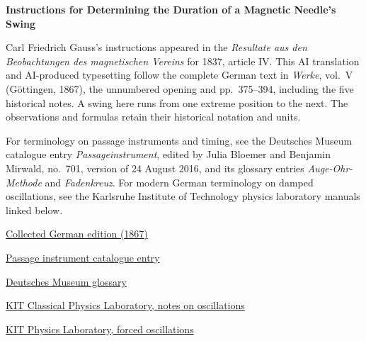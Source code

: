 \clearpage
\thispagestyle{empty}
\begin{center}\Large\textbf{Instructions for Determining the Duration of a Magnetic Needle’s Swing}\end{center}

Carl Friedrich Gauss’s instructions appeared in the \textit{Resultate aus den Beobachtungen des magnetischen Vereins} for 1837, article IV. This AI translation and AI-produced typesetting follow the complete German text in \textit{Werke}, vol.~V (Göttingen, 1867), the unnumbered opening and pp.~375--394, including the five historical notes. A swing here runs from one extreme position to the next. The observations and formulas retain their historical notation and units.

\smallskip\noindent
For terminology on passage instruments and timing, see the Deutsches Museum catalogue entry \textit{Passageinstrument}, edited by Julia Bloemer and Benjamin Mirwald, no.~701, version of 24 August 2016, and its glossary entries \textit{Auge-Ohr-Methode} and \textit{Fadenkreuz}. For modern German terminology on damped oscillations, see the Karlsruhe Institute of Technology physics laboratory manuals linked below.

\medskip\noindent
\href{https://gdz.sub.uni-goettingen.de/id/PPN236006339}{Collected German edition (1867)}\par
\noindent\href{https://digital.deutsches-museum.de/projekte/gruendungssammlung/detail/701/}{Passage instrument catalogue entry}\par
\noindent\href{https://digital.deutsches-museum.de/projekte/gruendungssammlung/glossar/}{Deutsches Museum glossary}\par
\noindent\href{https://labs.physik.kit.edu/prakt-klass-physik-manuals/P1/Resonanz/doc/Hinweise-Schwingung/}{KIT Classical Physics Laboratory, notes on oscillations}\par
\noindent\href{https://labs.physik.kit.edu/prakt-nebenfach-manuals/Experiments/Erzwungene_Schwingungen/}{KIT Physics Laboratory, forced oscillations}
\clearpage
